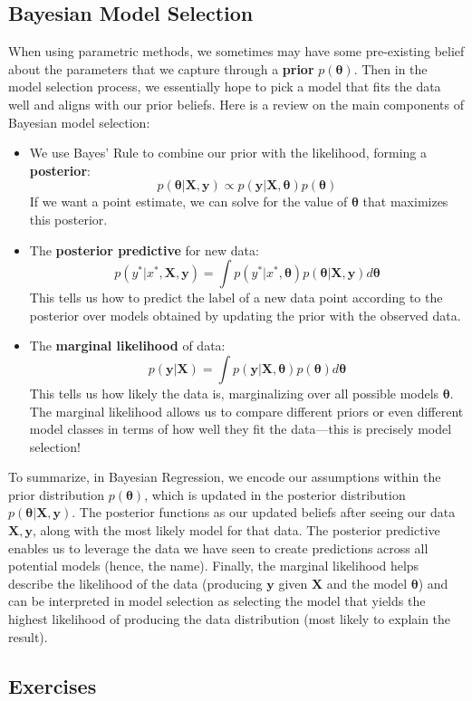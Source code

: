 \documentclass[11pt, letterpaper]{article}
\theoremstyle{definition}
\theoremstyle{plain}
\begin{document}
\subsection{Bayesian Model Selection}
When using parametric methods, we sometimes may have some pre-existing belief about the parameters that we capture through a \textbf{prior} $p(\bm \theta)$. Then in the model selection process, we essentially hope to pick a model that fits the data well and aligns with our prior beliefs. Here is a review on the main components of Bayesian model selection:
\begin{itemize}
	\item We use Bayes' Rule to combine our prior with the likelihood, forming a \textbf{posterior}: 
    \[p(\bm \theta | \bm X, \bm y) \propto p(\bm y|\bm X, \bm \theta) p(\bm \theta)\]
    If we want a point estimate, we can solve for the value of $\bm \theta$ that maximizes this posterior.
	\item The \textbf{posterior predictive} for new data: 
    \[p(y^*|x^*, \bm X, \bm y) = \int p(y^*|x^*, \bm \theta) p(\bm \theta | \bm X, \bm y) d\bm \theta\]
	This tells us how to predict the label of a new data point according to the posterior over models obtained by updating the prior with the observed data.
	\item The \textbf{marginal likelihood} of data: 
    \[p(\bm y|\bm X) = \int p(\bm y|\bm X, \bm \theta) p(\bm \theta) d\bm \theta\]
	This tells us how likely the data is, marginalizing over all possible models $\bm \theta$. The marginal likelihood allows us to compare different priors or even different model classes in terms of how well they fit the data---this is precisely model selection!
\end{itemize}
To summarize, in Bayesian Regression, we encode our assumptions within the prior distribution $p(\bm \theta)$, which is updated in the posterior distribution $p(\bm \theta|\bm X,\bm y)$. The posterior functions as our updated beliefs after seeing our data $\bm X,\bm y$, along with the most likely model for that data. The posterior predictive enables us to leverage the data we have seen to create predictions across all potential models (hence, the name). Finally, the marginal likelihood helps describe the likelihood of the data (producing $\bm y$ given $\bm X$ and the model $\bm \theta$) and can be interpreted in model selection as selecting the model that yields the highest likelihood of producing the data distribution (most likely to explain the result).

\subsection{Exercises}
\end{document}
